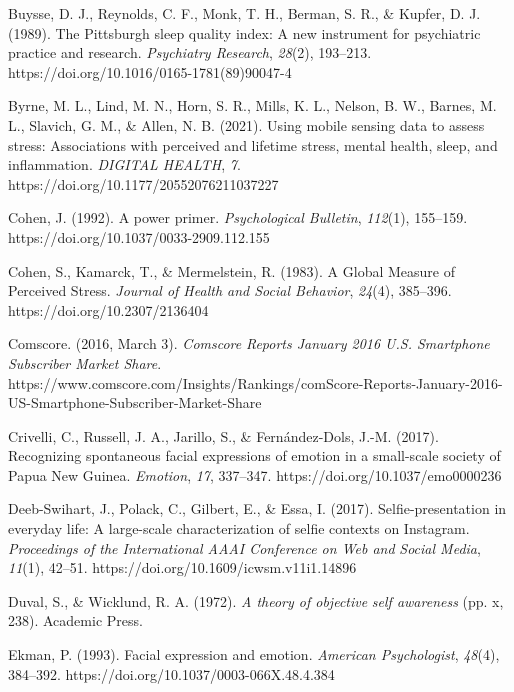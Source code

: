 \documentclass[authordate, empirical]{jote-new-article}
\begin{document}
Buysse, D. J., Reynolds, C. F., Monk, T. H., Berman, S. R., \& Kupfer, D. J. (1989). The Pittsburgh sleep quality index: A new instrument for psychiatric practice and research. \emph{Psychiatry Research}, \emph{28}(2), 193--213. https://doi.org/10.1016/0165-1781(89)90047-4



Byrne, M. L., Lind, M. N., Horn, S. R., Mills, K. L., Nelson, B. W., Barnes, M. L., Slavich, G. M., \& Allen, N. B. (2021). Using mobile sensing data to assess stress: Associations with perceived and lifetime stress, mental health, sleep, and inflammation. \emph{DIGITAL HEALTH}, \emph{7}. https://doi.org/10.1177/20552076211037227



Cohen, J. (1992). A power primer. \emph{Psychological Bulletin}, \emph{112}(1), 155--159. https://doi.org/10.1037/0033-2909.112.155



Cohen, S., Kamarck, T., \& Mermelstein, R. (1983). A Global Measure of Perceived Stress. \emph{Journal of Health and Social Behavior}, \emph{24}(4), 385--396. https://doi.org/10.2307/2136404



Comscore. (2016, March 3). \emph{Comscore}\emph{ Reports January 2016 U.S. Smartphone Subscriber Market Share}. https://www.comscore.com/Insights/Rankings/comScore-Reports-January-2016-US-Smartphone-Subscriber-Market-Share



Crivelli, C., Russell, J. A., Jarillo, S., \& Fernández-Dols, J.-M. (2017). Recognizing spontaneous facial expressions of emotion in a small-scale society of Papua New Guinea. \emph{Emotion}, \emph{17}, 337--347. https://doi.org/10.1037/emo0000236



Deeb-Swihart, J., Polack, C., Gilbert, E., \& Essa, I. (2017). Selfie-presentation in everyday life: A large-scale characterization of selfie contexts on Instagram. \emph{Proceedings of the International AAAI Conference on Web and }\emph{Social Media}, \emph{11}(1), 42--51. https://doi.org/10.1609/icwsm.v11i1.14896



Duval, S., \& Wicklund, R. A. (1972). \emph{A theory of objective }\emph{self awareness} (pp. x, 238). Academic Press.



Ekman, P. (1993). Facial expression and emotion. \emph{American Psychologist}, \emph{48}(4), 384--392. https://doi.org/10.1037/0003-066X.48.4.384
\end{document}
